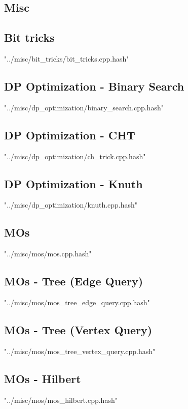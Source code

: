 \documentclass [a4paper,5pt,oneside, landscape]{article}
\begin{document}
\begin{multicols}{3}
\section{Misc}
\subsection{ Bit tricks}
 {"../misc/bit_tricks/bit_tricks.cpp.hash"}


\subsection{ DP Optimization - Binary Search}
 {"../misc/dp_optimization/binary_search.cpp.hash"}


\subsection{ DP Optimization - CHT}
 {"../misc/dp_optimization/ch_trick.cpp.hash"}


\subsection{ DP Optimization - Knuth}
 {"../misc/dp_optimization/knuth.cpp.hash"}


\subsection{ MOs}
 {"../misc/mos/mos.cpp.hash"}


\subsection{ MOs - Tree (Edge Query)}
 {"../misc/mos/mos_tree_edge_query.cpp.hash"}


\subsection{ MOs - Tree (Vertex Query)}
 {"../misc/mos/mos_tree_vertex_query.cpp.hash"}


\subsection{ MOs - Hilbert}
 {"../misc/mos/mos_hilbert.cpp.hash"}



\end{multicols}
\end{document}
